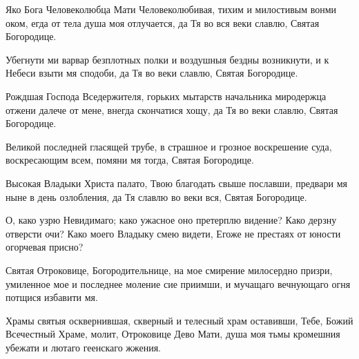 \begin{mymulticols}


Яко Бога Человеколюбца Мати Человеколюбивая, тихим и милостивым вонми оком, егда от тела душа моя отлучается, да Тя во вся веки славлю, Святая Богородице.


Убегнути ми варвар безплотных полки и воздушныя бездны возникнути, и к Небеси взыти мя сподоби, да Тя во веки славлю, Святая Богородице.


Рождшая Господа Вседержителя, горьких мытарств начальника миродержца отжени далече от мене, внегда скончатися хощу, да Тя во веки славлю, Святая Богородице.

\slava

Великой последней гласящей трубе, в страшное и грозное воскрешение суда, воскресающим всем, помяни мя тогда, Святая Богородице.

\inyne

Высокая Владыки Христа палато, Твою благодать свыше пославши, предвари мя ныне в день озлобления, да Тя славлю во веки вся, Святая Богородице.




О, како узрю Невидимаго; како ужасное оно претерплю видение? Како дерзну отверсти очи? Како моего Владыку смею видети, Егоже не престаях от юности огорчевая присно?


Святая Отроковице, Богородительнице, на мое смирение милосердно призри, умиленное мое и последнее моление сие приимши, и мучащаго вечнующаго огня потщися избавити мя.


Храмы святыя осквернившая, скверный и телесный храм оставивши, Тебе, Божий Всечестный Храме, молит, Отроковице Дево Мати, душа моя тьмы кромешния убежати и лютаго геенскаго жжения.


\end{mymulticols}
